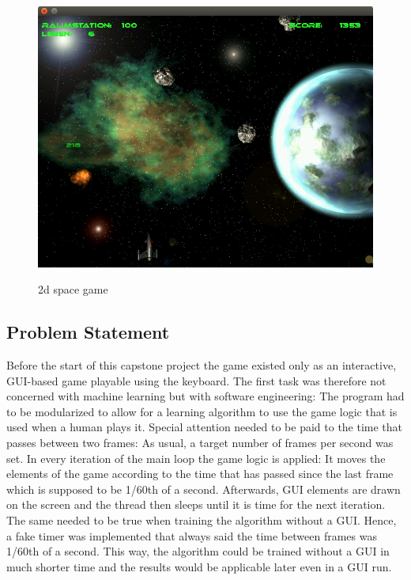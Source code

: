 \documentclass[a4paper,10pt]{article}
\begin{document}
\begin{figure}
 \centering
 \includegraphics[width=\linewidth]{game3.png}
 \label{fig:game}
 \caption{2d space game}
\end{figure}

\subsection{Problem Statement}
\label{problemstatement}
Before the start of this capstone project the game existed only as an interactive, GUI-based game playable using the keyboard. 
The first task was therefore not concerned with machine learning but with software engineering:
The program had to be modularized to allow for a learning algorithm to use the game logic that is used when a human plays it.
Special attention needed to be paid to the time that passes between two frames:
As usual, a target number of frames per second was set.
In every iteration of the main loop the game logic is applied: It moves the elements of the game according to the time that has passed since the last frame which is supposed to be 1/60th of a second.
Afterwards, GUI elements are drawn on the screen and the thread then sleeps until it is time for the next iteration.
The same needed to be true when training the algorithm without a GUI.
Hence, a fake timer was implemented that always said the time between frames was 1/60th of a second.
This way, the algorithm could be trained without a GUI in much shorter time and the results would be applicable later even in a GUI run.
\end{document}
